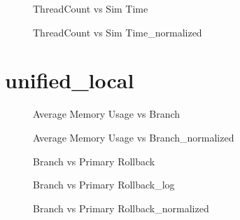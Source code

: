 \vspace{1cm}
\begin{figure}[H]
\centering

\caption{ThreadCount vs Sim Time}
\end{figure}
\vspace{1cm}
\newpage
\begin{figure}[H]
\centering

\caption{ThreadCount vs Sim Time\_normalized}
\end{figure}
\vspace{1cm}
\newpage

\section{unified\_local}
\begin{figure}[H]
\centering

\caption{Average Memory Usage vs Branch}
\end{figure}
\vspace{1cm}
\begin{figure}[H]
\centering

\caption{Average Memory Usage vs Branch\_normalized}
\end{figure}
\vspace{1cm}
\newpage
\begin{figure}[H]
\centering

\caption{Branch vs Primary Rollback}
\end{figure}
\vspace{1cm}
\begin{figure}[H]
\centering

\caption{Branch vs Primary Rollback\_log}
\end{figure}
\vspace{1cm}
\newpage
\begin{figure}[H]
\centering

\caption{Branch vs Primary Rollback\_normalized}
\end{figure}
